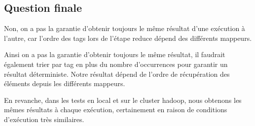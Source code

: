 \documentclass[a4paper, 11pt, titlepage]{article}
\begin{document}
\subsection* {Question finale}

Non, on a pas la garantie d'obtenir toujours le même résultat d'une exécution à l'autre, car l'ordre des tags lors de l'étape reduce dépend des différents mappeurs.

Ainsi on a pas la garantie d'obtenir toujours le même résultat, il faudrait également trier par tag en plus du nombre d'occurrences pour garantir un résultat déterministe. Notre résultat dépend de l'ordre de récupération des éléments depuis les différents mappeurs.

En revanche, dans les tests en local et sur le cluster hadoop, nous obtenons les mêmes résultats à chaque exécution, certainement en raison de conditions d'exécution très similaires.
\end{document}
